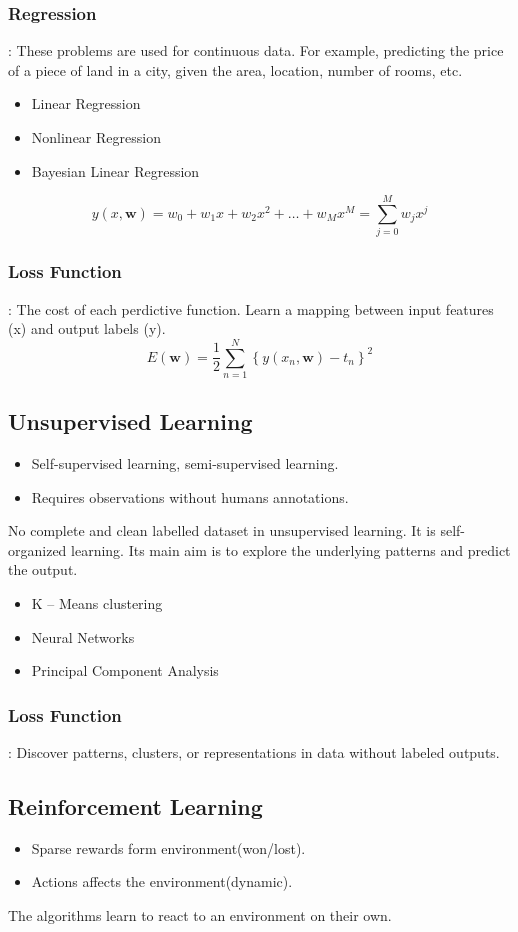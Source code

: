 \documentclass[11pt, english]{article}
\begin{document}
\subsubsection{Regression}: These problems are used for continuous data. For example, predicting the price of a piece of land in a city, given the area, location, number of rooms, etc.  
\begin{itemize}
    \item Linear Regression
    \item Nonlinear Regression
    \item Bayesian Linear Regression
\end{itemize}
\[y(x, \mathbf{w}) = w_0 + w_1x + w_2x^2 + \dots + w_Mx^M = \sum_{j=0}^{M} w_jx^j
\]
\subsubsection{Loss Function}: The cost of each perdictive function.  Learn a mapping between input features (x) and output labels (y).
\[E(\mathbf{w}) = \frac{1}{2} \sum_{n=1}^{N} \left\{ y(x_n, \mathbf{w}) - t_n \right\}^2
\]

 \subsection{Unsupervised Learning}
 \begin{itemize}
     \item Self-supervised learning, semi-supervised learning.
     \item Requires observations without humans annotations.
 \end{itemize}
No complete and clean labelled dataset in unsupervised learning. It is self-organized learning. Its main aim is to explore the underlying patterns and predict the output.  
\begin{itemize}
    \item K – Means clustering
    \item Neural Networks
    \item Principal Component Analysis
\end{itemize}
\subsubsection{Loss Function}: Discover patterns, clusters, or representations in data without labeled outputs. 
\subsection{Reinforcement Learning}
\begin{itemize}
    \item Sparse rewards form environment(won/lost).
    \item Actions affects the environment(dynamic).
\end{itemize}
The algorithms learn to react to an environment on their own.  
\end{document}
